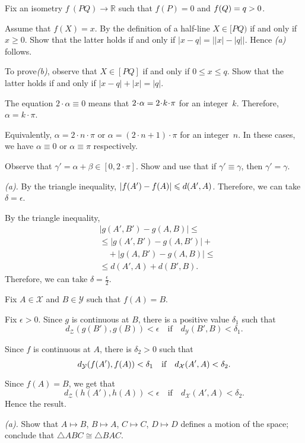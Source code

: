 Fix an isometry $f\:(P Q)\to \mathbb{R}$ such that $f(P)=0$ and $f(Q)=q>0$.

Assume that $f(X)=x$.
By the definition of a half-line $X\in[PQ)$ if and only if $x\ge 0$.
Show that the latter holds if and only if 
$|x-q|=\bigl||x|-|q|\bigr|$.
Hence \textit{(a)} follows.

To prove\textit{(b)}, observe that $X\in [PQ]$ if and only if $0\le x\le q$.
Show that the latter holds if and only if 
$|x-q|+|x|=|q|$.

The equation
$2\cdot\alpha\equiv 0$
means that $2\cdot\alpha\z=2\cdot k\cdot\pi$ for an integer~$k$.
Therefore,
$\alpha=k\cdot\pi$.

Equivalently, $\alpha=2\cdot n\cdot \pi$ or $\alpha=(2\cdot n+1)\cdot \pi$ for an integer~$n$.
In these cases, we have $\alpha\equiv 0$ or $\alpha\equiv \pi$ respectively.

Observe that $\gamma'=\alpha+\beta\in [0,2\cdot \pi]$.
Show and use that if $\gamma'\equiv\gamma$, then $\gamma'=\gamma$.

 \textit{(a).}
By the triangle inequality,
$|f(A')-f(A)|\leqslant d(A',A)$.
Therefore, we can take $\delta=\epsilon$.

By the triangle inequality,
\begin{align*}
&|g(A',B')-g(A,B)|
\le 
\\
&\le|g(A',B')-g(A,B')|+
\\
&\quad+
|g(A,B')-g(A,B)|\le
\\
&\le d(A',A)+d(B',B).
\end{align*}
Therefore, we can take $\delta=\tfrac\epsilon2$.

Fix $A\in \mathcal{X}$ and $B\in\mathcal{Y}$
such that $f(A)=B$.

Fix $\epsilon>0$.
Since $g$ is continuous at $B$, there is a positive value $\delta_1$ such that 
$$d_{\mathcal{Z}}(g(B'),g(B))<\epsilon
\quad
\text{if}
\quad
d_{\mathcal{Y}}(B',B)<\delta_1.$$ 

Since $f$ is continuous at $A$, there is $\delta_2>0$ such that 
$$d_{\mathcal{Y}}(f(A'),f(A))<\delta_1
\quad
\text{if}
\quad
d_{\mathcal{X}}(A',A)<\delta_2.$$ 

Since $f(A)=B$, we get that
$$d_{\mathcal{Z}}(h(A'),h(A))<\epsilon
\quad
\text{if}
\quad
d_{\mathcal{X}}(A',A)<\delta_2.$$ 
Hence the result.

 \textit{(a).}
Show that $A\mapsto B$, $B\mapsto A$, $C\mapsto C$, $D\mapsto D$ defines a motion of the space;
conclude that $\triangle ABC\cong \triangle BAC$.

